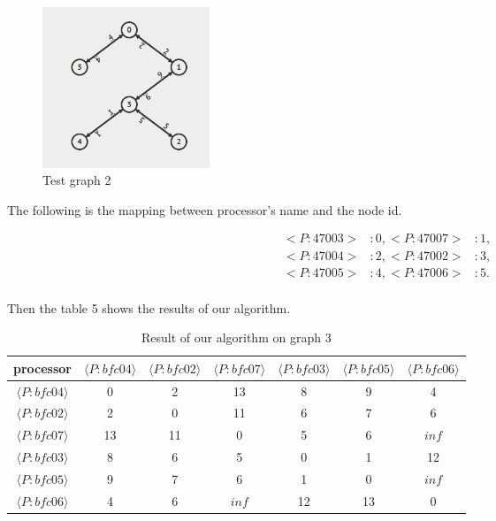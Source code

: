 \documentclass[11pt]{article}  %
\begin{document}
\begin{figure}[ht]
\centering
\includegraphics[width=5cm]{CP3_440Tree/CP3_440.png}
\caption{Test graph 2}
\end{figure}\par

The following is the mapping between processor's name and the node id.\par

\begin{equation}\nonumber
\begin{aligned}
<P:47003>&: 0, 
<P:47007>&: 1, \\
<P:47004>&: 2, 
<P:47002>&: 3, \\
<P:47005>&: 4, 
<P:47006>&: 5. \\
\end{aligned}
\end{equation}\par
Then the table 5 shows the results of our algorithm.\par 

\begin{table}[!htbp]
\centering
\setlength{\tabcolsep}{1mm}
\begin{tabular}{|c|c|c|c|c|c|c|}
\hline
processor&$\langle P:bfc04 \rangle$&$\langle P:bfc02\rangle$&$\langle P:bfc07\rangle$&$\langle P:bfc03\rangle$&$\langle P:bfc05\rangle$&$\langle P:bfc06\rangle$\\
\hline
$\langle P:bfc04\rangle$&0&2&13&8&9&4\\
\hline
$\langle P:bfc02\rangle$&2&0&11&6&7&6\\
\hline
$\langle P:bfc07\rangle$&13&11&0&5&6&$inf$\\
\hline
$\langle P:bfc03\rangle$&8&6&5&0&1&12\\
\hline
$\langle P:bfc05\rangle$&9&7&6&1&0&$inf$\\
\hline
$\langle P:bfc06\rangle$&4&6&$inf$&12&13&0\\
\hline
\end{tabular}
\caption{Result of our algorithm on graph 3}
\end{table}\par
\end{document}
